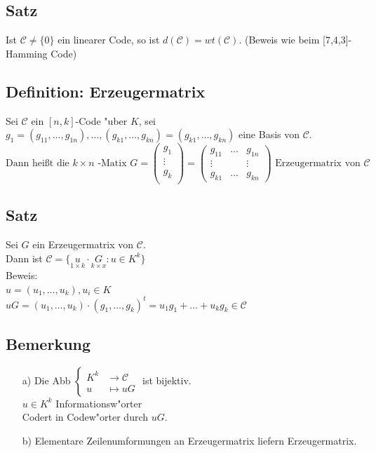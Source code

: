 \subsection{Satz}
Ist $\mathcal{C} \neq \lbrace 0 \rbrace$ ein linearer Code, so ist $d(\mathcal{C})=wt(\mathcal{C})$. (Beweis wie beim [7,4,3]-Hamming Code)

\subsection{Definition: Erzeugermatrix} %
Sei $\mathcal{C}$ ein $[n,k]$-Code "uber $K$, sei $g_1=(g_{11},\ldots,g_{1n}),\ldots,(g_{k1},\ldots,g_{kn})=(g_{k1},\ldots,g_{kn})$ eine Basis von $\mathcal{C}$.
\[
\text{Dann hei\ss t die } k\times n\text{ -Matix } G=
\begin{pmatrix}
g_1\\
\vdots \\
g_k\\
\end{pmatrix}
=
\begin{pmatrix}
	g_{11}&\ldots&g_{1n}\\
	\vdots&&\vdots\\
	g_{k1}&\ldots&g_{kn}
\end{pmatrix}
\text{ Erzeugermatrix von } \mathcal{C}
\]
\subsection{Satz}
Sei $G$ ein Erzeugermatrix von $\mathcal{C}$.\\
Dann ist $\mathcal{C} = \lbrace \underset{1\times k}{u} \cdot \underset{k\times x}{G}: u \in K^k \rbrace$\\
Beweis:\\
$u=(u_1,\ldots,u_k),u_i\in K$\\
$uG=(u_1,\ldots,u_k) \cdot (g_1,\ldots,g_k)^t=u_1g_1+\ldots + u_kg_k \in \mathcal{C}$\\
\subsection{Bemerkung}
\begin{itemize}
	\item[a)] Die Abb 
	$\begin{cases}
		K^k & \rightarrow \mathcal{C}\\
		u & \mapsto uG
	\end{cases}$ ist bijektiv. \\
	$u \in K^k$ Informationsw"orter \\
	Codert in Codew"orter durch $uG$.
	\item[b)] Elementare Zeilenumformungen an Erzeugermatrix liefern Erzeugermatrix.
\end{itemize}
